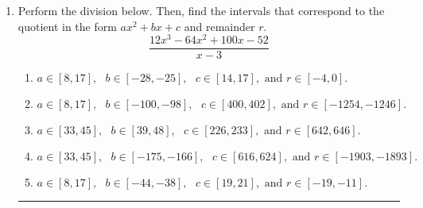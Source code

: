 \documentclass[14pt]{extbook}
\newcommand{\litem}[1]{\item#1\hspace*{-1cm}\rule{\textwidth}{0.4pt}}
\begin{document}
\begin{enumerate}
{\begin{enumerate}[label=\Alph*.]
\end{enumerate} }
\litem{
Perform the division below. Then, find the intervals that correspond to the quotient in the form $ax^2+bx+c$ and remainder $r$.\[ \frac{12x^{3} -64 x^{2} +100 x -52}{x -3} \]\begin{enumerate}[label=\Alph*.]
\item \( a \in [8, 17], \text{   } b \in [-28, -25], \text{   } c \in [14, 17], \text{   and   } r \in [-4, 0]. \)
\item \( a \in [8, 17], \text{   } b \in [-100, -98], \text{   } c \in [400, 402], \text{   and   } r \in [-1254, -1246]. \)
\item \( a \in [33, 45], \text{   } b \in [39, 48], \text{   } c \in [226, 233], \text{   and   } r \in [642, 646]. \)
\item \( a \in [33, 45], \text{   } b \in [-175, -166], \text{   } c \in [616, 624], \text{   and   } r \in [-1903, -1893]. \)
\item \( a \in [8, 17], \text{   } b \in [-44, -38], \text{   } c \in [19, 21], \text{   and   } r \in [-19, -11]. \)

\end{enumerate} }
\end{enumerate}
\end{document}

